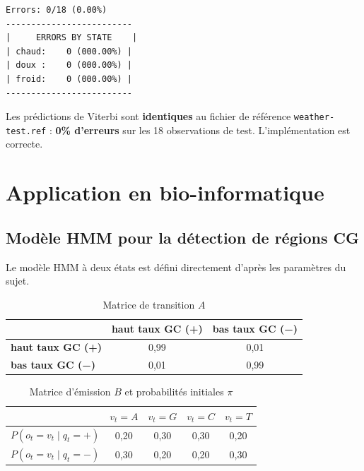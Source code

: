 \documentclass[12pt,a4paper]{article}
\begin{document}
\begin{lstlisting}[style=outputstyle]
Errors: 0/18 (0.00%)
-------------------------
|     ERRORS BY STATE    |
| chaud:    0 (000.00%) |
| doux :    0 (000.00%) |
| froid:    0 (000.00%) |
-------------------------
\end{lstlisting}

\begin{resultbox}
Les prédictions de Viterbi sont \textbf{identiques} au fichier de référence
\texttt{weather-test.ref} : \textbf{0\% d'erreurs} sur les 18 observations de test.
L'implémentation est correcte.
\end{resultbox}

\section{Application en bio-informatique}

\subsection{Modèle HMM pour la détection de régions CG}

Le modèle HMM à deux états est défini directement d'après les paramètres du sujet.

\begin{table}[H]
\centering
\caption{Matrice de transition $A$}
\begin{tabular}{lcc}
\toprule
 & \textbf{haut taux GC (+)} & \textbf{bas taux GC (−)} \\
\midrule
\textbf{haut taux GC (+)} & 0,99 & 0,01 \\
\textbf{bas taux GC (−)}  & 0,01 & 0,99 \\
\bottomrule
\end{tabular}
\end{table}

\begin{table}[H]
\centering
\caption{Matrice d'émission $B$ et probabilités initiales $\pi$}
\begin{tabular}{lcccc}
\toprule
 & $v_t = A$ & $v_t = G$ & $v_t = C$ & $v_t = T$ \\
\midrule
$P(o_t = v_t \mid q_t = +)$ & 0,20 & 0,30 & 0,30 & 0,20 \\
$P(o_t = v_t \mid q_t = -)$ & 0,30 & 0,20 & 0,20 & 0,30 \\
\bottomrule
\end{tabular}
\end{table}
\end{document}
